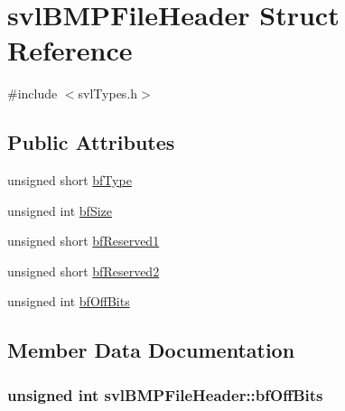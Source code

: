 \hypertarget{structsvl_b_m_p_file_header}{}\section{svl\+B\+M\+P\+File\+Header Struct Reference}
\label{structsvl_b_m_p_file_header}


{\ttfamily \#include $<$svl\+Types.\+h$>$}

\subsection*{Public Attributes}
\begin{DoxyCompactItemize}
\item 
unsigned short \hyperlink{structsvl_b_m_p_file_header_a4e1fb2f5208ced50a9c740d301c967b7}{bf\+Type}
\item 
unsigned int \hyperlink{structsvl_b_m_p_file_header_afbba986523d6c2e3c43a9f34f11013b2}{bf\+Size}
\item 
unsigned short \hyperlink{structsvl_b_m_p_file_header_a497a191d181f6f89f2c6265d6a5cca6a}{bf\+Reserved1}
\item 
unsigned short \hyperlink{structsvl_b_m_p_file_header_aa184ab5d6c02e6f008dc0ee002efdaf5}{bf\+Reserved2}
\item 
unsigned int \hyperlink{structsvl_b_m_p_file_header_ac33b347e5a22419e98cd48c7b28f02da}{bf\+Off\+Bits}
\end{DoxyCompactItemize}


\subsection{Member Data Documentation}
\hypertarget{structsvl_b_m_p_file_header_ac33b347e5a22419e98cd48c7b28f02da}{}
\subsubsection[{bf\+Off\+Bits}]{\setlength{\rightskip}{0pt plus 5cm}unsigned int svl\+B\+M\+P\+File\+Header\+::bf\+Off\+Bits}\label{structsvl_b_m_p_file_header_ac33b347e5a22419e98cd48c7b28f02da}
\hypertarget{structsvl_b_m_p_file_header_a497a191d181f6f89f2c6265d6a5cca6a}{}

